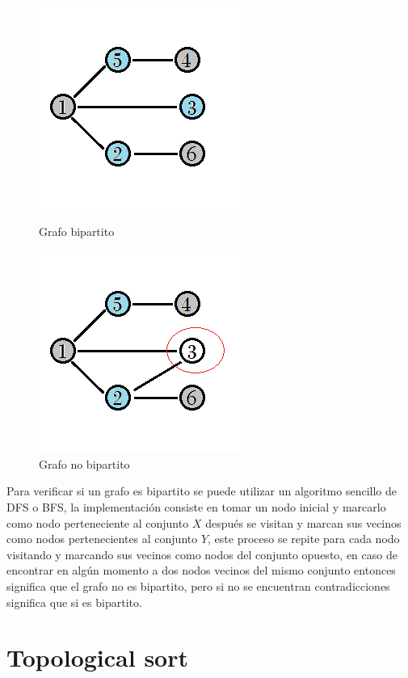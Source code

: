 \documentclass[12pt, a4paper]{article}
\newcommand\cppfile[2][]{

}
\begin{document}
	\begin{figure}[!htb]
			\centering
			\includegraphics[scale=1]{Grafos/imagenes/bipartitos/BipartitoSi}
			\caption{Grafo bipartito}
			\label{grafos:bipartitos:BipartitoSi}
		\endminipage
			\centering
			\includegraphics[scale=1]{Grafos/imagenes/bipartitos/BipartitoNo}
			\caption{Grafo no bipartito}
			\label{grafos:bipartitos:BipartitoNo}
		\endminipage
	\end{figure}	
	
	Para verificar si un grafo es bipartito se puede utilizar un algoritmo sencillo de DFS o BFS, la implementación
	consiste en tomar un nodo inicial y marcarlo como nodo perteneciente al conjunto $X$ después se visitan y marcan 
	sus vecinos como nodos pertenecientes al conjunto $Y$, este proceso se repite para cada nodo visitando y marcando 
	sus vecinos como nodos del conjunto opuesto, en caso de encontrar en algún momento a dos nodos vecinos del mismo
	conjunto entonces significa que el grafo no es bipartito, pero si no se encuentran contradicciones significa que 
	si es bipartito.
	\cppfile[14-42]{Grafos/codigos/BipartiteCheck.cpp}
	
	\section{Topological sort}
	\label{grafos:topological_sort}
	
\end{document}
